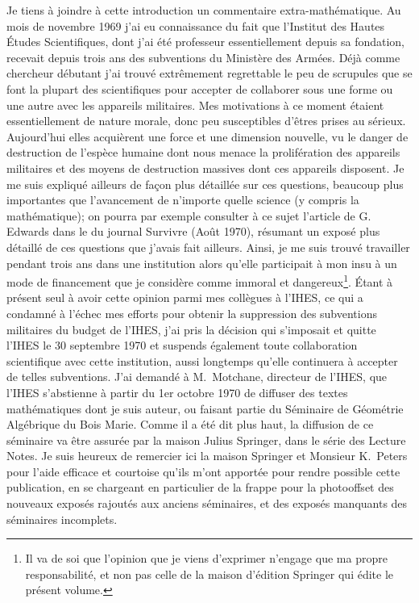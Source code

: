 Je tiens \`a joindre \`a cette introduction un commentaire
extra-math\'ematique. Au mois de novembre 1969 j'ai eu connaissance
du fait que l'Institut des Hautes \'Etudes Scientifiques, dont j'ai
\'et\'e professeur essentiellement depuis sa fondation, recevait
depuis trois ans des subventions du Minist\`ere des
Arm\'ees. D\'ej\`a comme chercheur d\'ebutant j'ai trouv\'e
extr\^emement regrettable le peu de scrupules que se font la plupart
des scientifiques pour accepter de collaborer sous une forme ou une
autre avec les appareils militaires. Mes motivations \`a ce moment
\'etaient essentiellement de nature morale, donc peu susceptibles
d'\^etres prises au s\'erieux. Aujourd'hui elles acqui\`erent
une force et une dimension nouvelle, vu le danger de destruction de
l'esp\`ece humaine dont nous menace la prolif\'eration des
appareils militaires et des moyens de destruction massives dont ces
appareils disposent. Je me suis expliqu\'e ailleurs de fa\c con
plus d\'etaill\'ee sur ces questions, beaucoup plus importantes
que l'avancement de n'importe quelle science (y compris la
math\'ematique); on pourra par exemple consulter \`a ce sujet
l'article de G.\, Edwards dans le  du journal Survivre (Ao\^ut
1970), r\'esumant un expos\'e plus d\'etaill\'e de ces
questions que j'avais fait ailleurs. Ainsi, je me suis trouv\'e
travailler pendant trois ans dans une institution alors qu'elle participait \`a
mon insu \`a un mode de financement que je consid\`ere comme
immoral et dangereux\footnote{Il va de soi que l'opinion que je viens
d'exprimer n'engage que ma propre responsabilit\'e, et non pas celle
de la maison d'\'edition Springer qui \'edite le pr\'esent
volume.}. \'Etant \`a pr\'esent seul \`a avoir cette opinion parmi
mes coll\`egues \`a l'IHES, ce qui a condamn\'e \`a
l'\'echec mes efforts pour obtenir la suppression des subventions
militaires du budget de l'IHES, j'ai pris la d\'ecision qui
s'imposait et quitte l'IHES le 30 septembre 1970 et suspends
\'egalement toute collaboration scientifique avec cette institution,
aussi longtemps qu'elle continuera \`a accepter de telles
subventions. J'ai demand\'e \`a M.\, Motchane, directeur de l'IHES,
que l'IHES s'abstienne \`a partir du 1er octobre 1970 de diffuser des textes
math\'ematiques dont je suis auteur, ou faisant partie du
S\'eminaire de G\'eom\'etrie Alg\'ebrique du Bois Marie. Comme
il a \'et\'e dit plus haut, la diffusion de ce s\'eminaire va
\^etre assur\'ee par la maison Julius Springer, dans le s\'erie
des Lecture Notes. Je suis heureux de remercier ici la maison Springer
et Monsieur K.\, Peters pour l'aide efficace et courtoise qu'ils m'ont
apport\'ee pour rendre possible cette publication, en se chargeant
en particulier de la frappe pour la photooffset des nouveaux
expos\'es rajout\'es aux anciens s\'eminaires, et des
expos\'es manquants des s\'eminaires incomplets.

